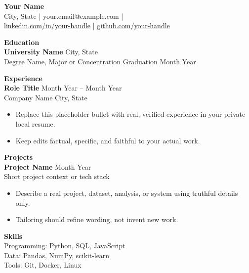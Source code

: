 \documentclass[11pt]{article}
\begin{document}
\begin{center}
  {\LARGE \textbf{Your Name}} \\
  City, State \quad | \quad your.email@example.com \quad | \quad [phone] \\
  \href{https://linkedin.com/in/your-handle}{linkedin.com/in/your-handle} \quad | \quad
  \href{https://github.com/your-handle}{github.com/your-handle}
\end{center}

\vspace{0.12in}
\textbf{\large Education} \\
\textbf{University Name} \hfill City, State \\
Degree Name, Major or Concentration \hfill Graduation Month Year

\vspace{0.12in}
\textbf{\large Experience} \\
\textbf{Role Title} \hfill Month Year -- Month Year \\
Company Name \hfill City, State
\begin{itemize}
  \item Replace this placeholder bullet with real, verified experience in your private local resume.
  \item Keep edits factual, specific, and faithful to your actual work.
\end{itemize}

\vspace{0.12in}
\textbf{\large Projects} \\
\textbf{Project Name} \hfill Month Year \\
Short project context or tech stack
\begin{itemize}
  \item Describe a real project, dataset, analysis, or system using truthful details only.
  \item Tailoring should refine wording, not invent new work.
\end{itemize}

\vspace{0.12in}
\textbf{\large Skills} \\
Programming: Python, SQL, JavaScript \\
Data: Pandas, NumPy, scikit-learn \\
Tools: Git, Docker, Linux
\end{document}
